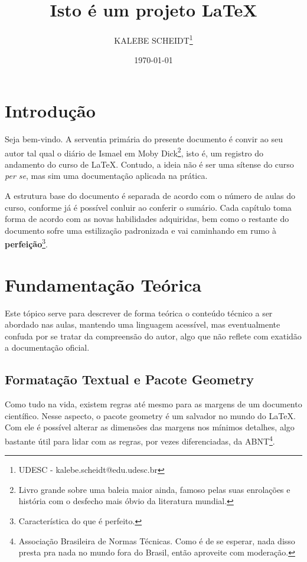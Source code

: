\documentclass[12pt, a4paper, twocolumn] {article} %
\title{Isto é um projeto \LaTeX} %
\author %
    {KALEBE SCHEIDT\thanks{UDESC - kalebe.scheidt@edu.udesc.br}}
\date{\today} %
\begin{document}

\maketitle %

\begin{abstract} %
    \lipsum[1-2] %
\end{abstract} %


\tableofcontents %

\section{Introdução} %
Seja bem-vindo. A serventia primária do presente documento é convir ao seu autor tal qual o diário de Ismael em Moby Dick\footnote{Livro grande sobre uma baleia maior ainda, famoso pelas suas enrolações e história com o desfecho mais óbvio da literatura mundial.}, isto é, um registro do andamento do curso de LaTeX. Contudo, a ideia não é ser uma sítense do curso \textit{per se}, mas sim uma documentação aplicada na prática.


A estrutura base do documento é separada de acordo com o número de aulas do curso, conforme já é possível conluir ao conferir o sumário. Cada capítulo toma forma de acordo com as novas habilidades adquiridas, bem como o restante do documento sofre uma estilização padronizada e vai caminhando em rumo à \textbf{perfeição}\footnote{Característica do que é perfeito.}.

\section{Fundamentação Teórica}

Este tópico serve para descrever de forma teórica o conteúdo técnico a ser abordado nas aulas, mantendo uma linguagem acessível, mas eventualmente confuda por se tratar da compreensão do autor, algo que não reflete com exatidão a documentação oficial.

\subsection{Formatação Textual e Pacote Geometry}
Como tudo na vida, existem regras até mesmo para as margens de um documento científico. Nesse aspecto, o pacote geometry é um salvador no mundo do \LaTeX. Com ele é possível alterar as dimensões das margens nos mínimos detalhes, algo bastante útil para lidar com as regras, por vezes diferenciadas, da ABNT\footnote{Associação Brasileira de Normas Técnicas. Como é de se esperar, nada disso presta pra nada no mundo fora do Brasil, então aproveite com moderação.}.
\end{document}
